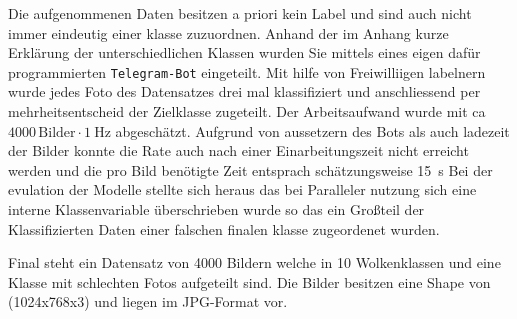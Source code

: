 Die aufgenommenen Daten besitzen a priori kein Label und sind auch nicht immer
eindeutig einer klasse zuzuordnen.
Anhand der im Anhang kurze Erklärung der unterschiedlichen Klassen wurden Sie
mittels eines eigen dafür programmierten \texttt{Telegram-Bot} eingeteilt.
Mit hilfe von Freiwilliigen labelnern wurde jedes Foto des Datensatzes drei mal
klassifiziert und anschliessend per mehrheitsentscheid der Zielklasse zugeteilt.
Der Arbeitsaufwand wurde mit ca $\num{4000} \, \text{Bilder} \cdot \SI{1}{\hertz}$
abgeschätzt.
Aufgrund von aussetzern des Bots als auch ladezeit der Bilder konnte die Rate
auch nach einer Einarbeitungszeit nicht erreicht werden und die pro Bild benötigte Zeit entsprach schätzungsweise
\SI{15}{\second}
Bei der evulation der Modelle stellte sich heraus das bei Paralleler nutzung
sich eine interne Klassenvariable überschrieben wurde so das ein Großteil der
Klassifizierten Daten einer falschen finalen klasse zugeordenet wurden. 

Final steht ein Datensatz von \num{4000} Bildern welche in 10 Wolkenklassen und
eine Klasse mit schlechten Fotos aufgeteilt sind. Die Bilder besitzen eine Shape
von (1024x768x3) und liegen im JPG-Format vor.

